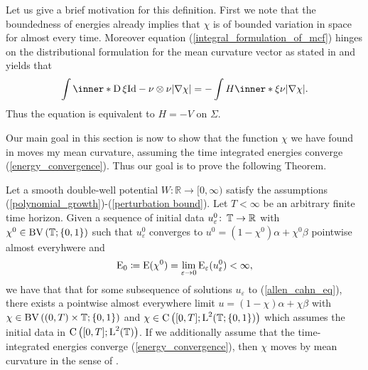 Let us give a brief motivation for this definition. First we note that the 
boundedness of energies already implies that $ \chi $ is of bounded variation 
in space for almost every time. Moreover equation 
(\ref{integral_formulation_of_mcf}) hinges on the distributional formulation 
for the mean curvature vector as stated in 
\cite{maggi_sets_of_finite_perimeter} and yields that
\begin{equation*}
	\int
		\inner*{ \diff \xi }{ \mathrm{Id} - \nu \otimes \nu }
	\abs{ \nabla \chi }
	=
	-
	\int
		H \inner*{ \xi }{ \nu }
	\abs{ \nabla \chi }.
\end{equation*}
Thus the equation is equivalent to $ H = - V $ on $ \Sigma $.

Our main goal in this section is now to show that the function $ \chi $ we have 
found in  moves my mean curvature, assuming 
the time integrated energies converge (\ref{energy_convergence}). Thus our 
goal is to prove the following Theorem.
\begin{theorem}
	\label{convergence_to_twophase_mcf}
	Let a smooth double-well potential $ W \colon \mathbb{ R } \to [ 0, \infty 
	) 
	$ satisfy the assumptions (\ref{polynomial_growth})-(\ref{perturbation 
		bound}). Let $ T < \infty $ be an arbitrary finite time horizon. Given 
		a 
	sequence of initial data $ u_{ \varepsilon }^{ 0 } \colon \operatorname{\mathbb{T}} \to 
	\mathbb{ R } $ with $ \chi^{ 0 } \in \operatorname{BV} \left( \operatorname{\mathbb{T}} ; \{ 0 , 1 \} 
	\right) 
	$ such that $ u_{ \varepsilon }^{ 0 } $ converges to $ u^{ 0 } = ( 1- 
	\chi^{ 0} ) \alpha 
	+ \chi^{ 0 } \beta $ pointwise almost everyhwere and
	\begin{equation*}
		\operatorname{E}_{ 0 }
		\coloneqq
		\operatorname{E} ( \chi^{ 0 } )
		=
		\lim_{ \varepsilon \to 0 }
		\operatorname{E}_{ \varepsilon } ( u_{ \varepsilon}^{ 0 } )
		< 
		\infty,
	\end{equation*}
	we have that that for some subsequence of solutions $ u_{ \varepsilon } $ 
	to 
	(\ref{allen_cahn_eq}), there exists a pointwise 
	almost everywhere limit $ u = ( 1 - \chi ) \alpha + \chi \beta $ with $ 
	\chi \in \operatorname{BV} \left( ( 0, T ) \times \operatorname{\mathbb{T}} ; \{ 0 , 1 \} \right) $ and
	$ \chi \in \operatorname{C} \left( [ 0 , T ] ; \operatorname{L}^{ 2 } (\operatorname{\mathbb{T}} ; \{ 0 , 1 \} ) 
	\right) $ which assumes the initial data in $ \operatorname{C} \left( [ 0, T ] ; 
	\operatorname{L}^{ 2 }( \operatorname{\mathbb{T}} ) \right) $. If we additionally assume that the 
	time-integrated energies converge (\ref{energy_convergence}), then $ \chi 
	$ moves by mean curvature in the sense of .
\end{theorem} 
